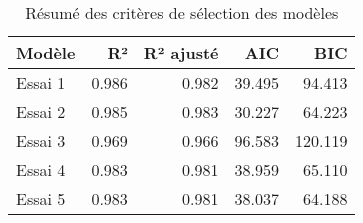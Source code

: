 \begin{table}
\caption{Résumé des critères de sélection des modèles}
\label{tab:regression_summary}
\begin{tabular}{lrrrr}
\toprule
Modèle & R² & R² ajusté & AIC & BIC \\
\midrule
Essai 1 & 0.986 & 0.982 & 39.495 & 94.413 \\
Essai 2 & 0.985 & 0.983 & 30.227 & 64.223 \\
Essai 3 & 0.969 & 0.966 & 96.583 & 120.119 \\
Essai 4 & 0.983 & 0.981 & 38.959 & 65.110 \\
Essai 5 & 0.983 & 0.981 & 38.037 & 64.188 \\
\bottomrule
\end{tabular}
\end{table}
